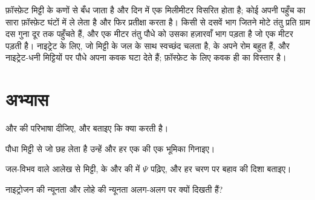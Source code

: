\begin{example}[फ़ॉस्फ़ेट को कवक क्यों चाहिए]\label{ex:b1:plant-water-minerals:phosphate}
फ़ॉस्फ़ेट मिट्टी के कणों से बँध जाता है और दिन में एक मिलीमीटर विसरित
होता है; कोई  अपनी पहुँच का सारा फ़ॉस्फ़ेट घंटों में ले लेता है और
फिर प्रतीक्षा करता है। किसी  से दसवें भाग जितने मोटे तंतु प्रति
ग्राम  दस गुना दूर तक पहुँचते हैं, और एक मीटर तंतु पौधे को उसका
हज़ारवाँ भाग पड़ता है जो एक मीटर  पड़ती है। नाइट्रेट के लिए, जो
मिट्टी के जल के साथ स्वच्छंद चलता है,  के अपने रोम बहुत हैं, और
नाइट्रेट-धनी मिट्टियों पर पौधे अपना कवक घटा देते हैं; फ़ॉस्फ़ेट के लिए
कवक ही  का विस्तार है।
\end{example}

\section{अभ्यास}

\begin{exercise}[$\star$]\label{exo:b1:plant-water-minerals:1}
 और  की परिभाषा दीजिए, और बताइए कि  क्या करती है।
\end{exercise}

\begin{exercise}[$\star$]\label{exo:b1:plant-water-minerals:2}
पौधा मिट्टी से जो छह  लेता है उन्हें और हर एक की एक भूमिका
गिनाइए।
\end{exercise}

\begin{exercise}[$\star$]\label{exo:b1:plant-water-minerals:3}
जल-विभव वाले आलेख से मिट्टी,  के  और  की  में $\Psi$
पढ़िए, और हर चरण पर बहाव की दिशा बताइए।
\end{exercise}

\begin{exercise}[$\star$]\label{exo:b1:plant-water-minerals:4}
नाइट्रोजन की न्यूनता और लोहे की न्यूनता अलग-अलग  पर क्यों दिखती
हैं?
\end{exercise}

